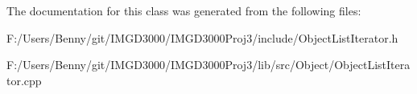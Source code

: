 The documentation for this class was generated from the following files\+:\begin{DoxyCompactItemize}
\item 
F\+:/\+Users/\+Benny/git/\+I\+M\+G\+D3000/\+I\+M\+G\+D3000\+Proj3/include/Object\+List\+Iterator.\+h\item 
F\+:/\+Users/\+Benny/git/\+I\+M\+G\+D3000/\+I\+M\+G\+D3000\+Proj3/lib/src/\+Object/Object\+List\+Iterator.\+cpp\end{DoxyCompactItemize}
